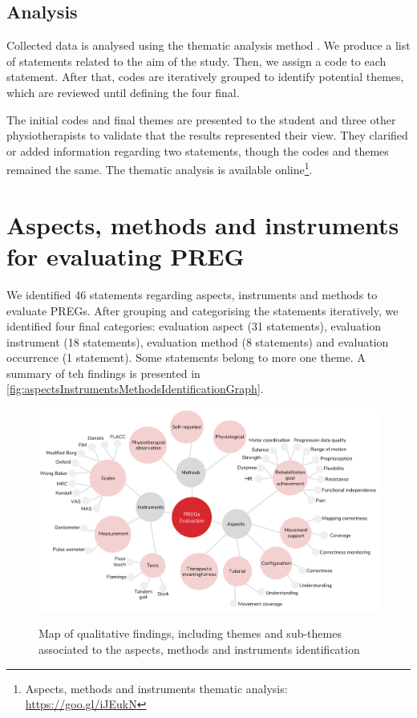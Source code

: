 \subsection{Analysis}
Collected data is analysed using the thematic analysis method \autocite{Burnard2008}. We produce a list of statements related to the aim of the study. Then, we assign a code to each statement. After that, codes are iteratively grouped to identify potential themes, which are reviewed until defining the four final. 

The initial codes and final themes are presented to the student and three other physiotherapists to validate that the results represented their view. They clarified or added information regarding two statements, though the codes and themes remained the same. The thematic analysis is available online\footnote{Aspects, methods and instruments thematic analysis: \url{https://goo.gl/iJEukN}}.


\section{Aspects, methods and instruments for evaluating PREG}\label{sec:findings_aspects} %
We identified 46 statements regarding aspects, instruments and methods to evaluate \acp{PREG}. After grouping and categorising the statements iteratively, we identified four final categories: evaluation aspect (31 statements), evaluation instrument (18 statements), evaluation method (8 statements) and evaluation occurrence (1 statement). Some statements belong to more one theme. A summary of teh findings is presented in \autoref{fig:aspectsInstrumentsMethodsIdentificationGraph}.

\begin{figure}[htb]
\myfloatalign
{\includegraphics[width=\linewidth]{gfx/aspects/aspectsInstrumentsMethodsIdentificationGraph}} \quad
\caption{Map of qualitative findings, including themes and sub-themes associated to the aspects, methods and instruments identification}\label{fig:aspectsInstrumentsMethodsIdentificationGraph}
\end{figure}

